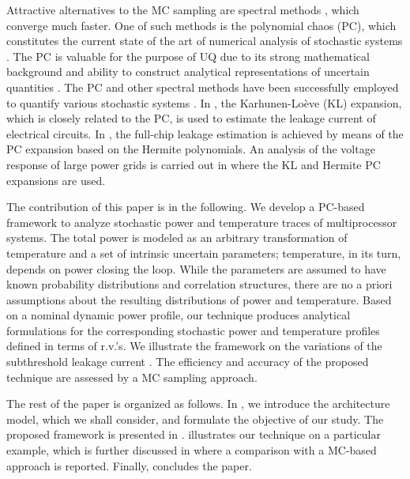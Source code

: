Attractive alternatives to the MC sampling are spectral methods \cite{ghanem1991, xiu2010, maitre2010}, which converge much faster. One of such methods is the polynomial chaos (PC), which constitutes the current state of the art of numerical analysis of stochastic systems \cite{xiu2009}. The PC is valuable for the purpose of UQ due to its strong mathematical background and ability to construct analytical representations of uncertain quantities \cite{eldred2009}. The PC and other spectral methods have been successfully employed to quantify various stochastic systems \cite{xiu2010}. In \cite{bhardwaj2006}, the Karhunen-Lo\`{e}ve (KL) expansion, which is closely related to the PC, is used to estimate the leakage current of electrical circuits. In \cite{shen2009}, the full-chip leakage estimation is achieved by means of the PC expansion based on the Hermite polynomials. An analysis of the voltage response of large power grids is carried out in \cite{ghanta2006} where the KL and Hermite PC expansions are used.

The contribution of this paper is in the following. We develop a PC-based framework to analyze stochastic power and temperature traces of multiprocessor systems. The total power is modeled as an arbitrary transformation of temperature and a set of intrinsic uncertain parameters; temperature, in its turn, depends on power closing the loop. While the parameters are assumed to have known probability distributions and correlation structures, there are no a priori assumptions about the resulting distributions of power and temperature. Based on a nominal dynamic power profile, our technique produces analytical formulations for the corresponding stochastic power and temperature profiles defined in terms of r.v.'s. We illustrate the framework on the variations of the subthreshold leakage current \cite{srivastava2010}. The efficiency and accuracy of the proposed technique are assessed by a MC sampling approach.

The rest of the paper is organized as follows. In , we introduce the architecture model, which we shall consider, and formulate the objective of our study. The proposed framework is presented in .  illustrates our technique on a particular example, which is further discussed in  where a comparison with a MC-based approach is reported. Finally,  concludes the paper.
